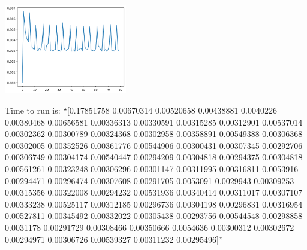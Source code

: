 \documentclass{article}
\begin{document}
\includegraphics[width=0.4\textwidth]{graphBlockSize.png}


Time to run is: 
``[0.17851758 0.00670314 0.00520658 0.00438881 0.0040226  0.00380468 0.00656581 0.00336313 0.00330591 0.00315285 0.00312901 0.00537014 0.00302362 0.00300789 0.00324368 0.00302958 0.00358891 0.00549388 0.00306368 0.00302005 0.00352526 0.00361776 0.00544906 0.00300431 0.00307345 0.00292706 0.00306749 0.00304174 0.00540447 0.00294209 0.00304818 0.00294375 0.00304818 0.00561261 0.00323248 0.00306296 0.00301147 0.00311995 0.00316811 0.0053916  0.00294471 0.00296474 0.00307608 0.00291705 0.0053091  0.0029943  0.00309253 0.00315356 0.00322008 0.00294232 0.00531936 0.00340414 0.00311017 0.00307107 0.00333238 0.00525117 0.00312185 0.00296736 0.00304198 0.00296831 0.00316954 0.00527811 0.00345492 0.00332022 0.00305438 0.00293756 0.00544548 0.00298858 0.0031178  0.00291729 0.00308466 0.00350666 0.0054636  0.00300312 0.00302672 0.00294971 0.00306726 0.00539327 0.00311232 0.00295496]''
\end{document}
